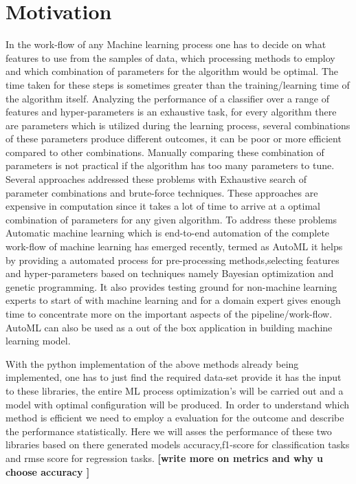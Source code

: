 \section{Motivation}
In the work-flow of any Machine learning process one has to decide on what features to use from the samples of data, which processing methods to employ and which combination of parameters for the algorithm would be optimal. The time taken for these steps is sometimes greater than the training/learning time of the algorithm itself. 
Analyzing the performance of a classifier over a range of features and hyper-parameters is an exhaustive task, for every algorithm there are parameters  which is utilized during the learning process, several combinations of these parameters produce different outcomes, it can be poor or more efficient compared to other combinations. Manually comparing these combination of parameters is not practical if the algorithm has too many parameters to tune. Several approaches addressed these problems with Exhaustive search of parameter combinations and brute-force techniques. These approaches are expensive in computation since it takes a lot of time to arrive at a optimal combination of parameters for any given algorithm. To address these problems Automatic machine learning which is end-to-end automation of the complete work-flow of machine learning has emerged recently, termed as AutoML\cite{autoML} it helps by providing a automated process for pre-processing methods,selecting features and hyper-parameters based on techniques namely Bayesian optimization and genetic programming. It also provides testing ground for non-machine learning experts to start of with machine learning and for a domain expert gives enough time to concentrate more on the important aspects of the pipeline/work-flow. AutoML can also be used as a out of the box application in building machine learning model.

With the python implementation of the above methods already being implemented, one has to just find the required data-set provide it has the input to these libraries, the entire ML process optimization's will be carried out and a model with optimal configuration will be produced.
In order to understand which method is efficient we need to employ a evaluation for the outcome and describe the performance statistically. Here we will asses the performance of these two libraries based on there generated models accuracy,f1-score for classification tasks and rmse score for regression tasks. \textbf{[write more on metrics and why u choose accuracy ]}

